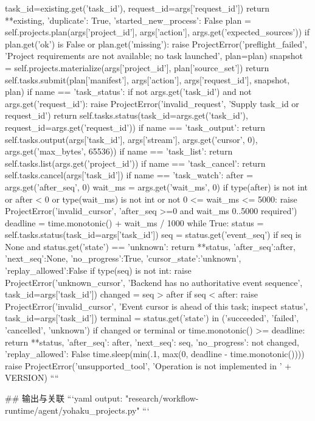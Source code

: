                                        task_id=existing.get('task_id'), request_id=args['request_id'])
                return {**existing, 'duplicate': True, 'started_new_process': False}
            plan = self.projects.plan(args['project_id'], args['action'], args.get('expected_sources'))
            if plan.get('ok') is False or plan.get('missing'):
                raise ProjectError('preflight_failed', 'Project requirements are not available; no task launched', plan=plan)
            snapshot = self.projects.materialize(args['project_id'], plan['source_set'])
            return self.tasks.submit(plan['manifest'], args['action'], args['request_id'], snapshot, plan)
        if name == 'task_status':
            if not args.get('task_id') and not args.get('request_id'):
                raise ProjectError('invalid_request', 'Supply task_id or request_id')
            return self.tasks.status(task_id=args.get('task_id'), request_id=args.get('request_id'))
        if name == 'task_output':
            return self.tasks.output(args['task_id'], args['stream'], args.get('cursor', 0), args.get('max_bytes', 65536))
        if name == 'task_list':
            return self.tasks.list(args.get('project_id'))
        if name == 'task_cancel':
            return self.tasks.cancel(args['task_id'])
        if name == 'task_watch':
            after = args.get('after_seq', 0)
            wait_ms = args.get('wait_ms', 0)
            if type(after) is not int or after < 0 or type(wait_ms) is not int or not 0 <= wait_ms <= 5000:
                raise ProjectError('invalid_cursor', 'after_seq >=0 and wait_ms 0..5000 required')
            deadline = time.monotonic() + wait_ms / 1000
            while True:
                status = self.tasks.status(task_id=args['task_id'])
                seq = status.get('event_seq')
                if seq is None and status.get('state') == 'unknown':
                    return {**status, 'after_seq':after, 'next_seq':None,
                            'no_progress':True, 'cursor_state':'unknown', 'replay_allowed':False}
                if type(seq) is not int:
                    raise ProjectError('unknown_cursor', 'Backend has no authoritative event sequence', task_id=args['task_id'])
                changed = seq > after
                if seq < after:
                    raise ProjectError('invalid_cursor', 'Event cursor is ahead of this task; inspect status', task_id=args['task_id'])
                terminal = status.get('state') in ('succeeded', 'failed', 'cancelled', 'unknown')
                if changed or terminal or time.monotonic() >= deadline:
                    return {**status, 'after_seq': after, 'next_seq': seq,
                            'no_progress': not changed, 'replay_allowed': False}
                time.sleep(min(.1, max(0, deadline - time.monotonic())))
        raise ProjectError('unsupported_tool', 'Operation is not implemented in ' + VERSION)
````

## 输出与关联
```yaml
output: "research/workflow-runtime/agent/yohaku_projects.py"
```
